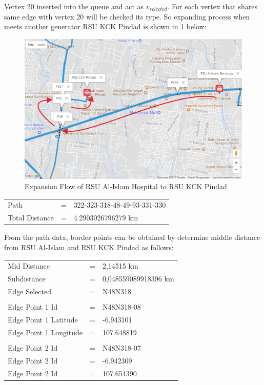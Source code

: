 Vertex 20 inserted into the queue and act as $v_{selected}$. For each vertex that shares same edge with vertex 20 will be checked its type. So expanding process when meets another generator RSU KCK Pindad is shown in \ref{fig:alur_expand} below:

\begin{figure}[H]
    \centering
    \includegraphics[scale=0.55]{data_proc_1_2.png}
    \caption{Expansion Flow of RSU Al-Islam Hospital to RSU KCK Pindad}
    \label{fig:alur_expand}
\end{figure}

\begin{table}[H]
\begin{tabular}{lll}
Path & = & 322-323-318-48-49-93-331-330 \\
Total Distance & = & 4.2903026796279 km\\
\end{tabular}
\end{table}

From the path data, border points can be obtained by determine middle distance from RSU Al-Islam and RSU KCK Pindad as follows:

\begin{table}[H]
\begin{tabular}{lll}
Mid Distance & = & 2,14515 km \\
Subdistance & = & 0,048559089918396 km\\
Edge Selected & = & N48N318\\
 & &\\
Edge Point 1 Id  & = & N48N318-08\\
Edge Point 1 Latitude & = & -6.943101\\
Edge Point 1 Longitude & = & 107.648819\\
 & &\\
Edge Point 2 Id  & = & N48N318-07\\
Edge Point 2 Id  & = & -6.942309\\
Edge Point 2 Id  & = & 107.651390\\
\end{tabular}
\end{table}

